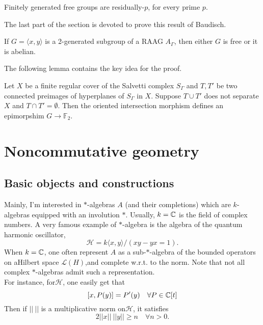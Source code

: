 \begin{prop}
Finitely generated free groups are residually-$p$, for every prime $p$.
\end{prop}

The last part of the section is devoted to prove this result of Baudisch.
\begin{thm}
If $G=\langle x, y \rangle$ is a 2-generated subgroup of a RAAG $A_\Gamma$, then either $G$ is free or it is abelian. 
\end{thm}

The following lemma contains the key idea for the proof. 
\begin{lem}
Let $X$ be a finite regular cover of the Salvetti complex $S_\Gamma$ and $T,T'$ be two connected preimages of hyperplanes of $S_\Gamma$ in $X$. Suppose $T\cup T'$ does not separate $X$ and $T\cap T'=\emptyset$. Then the oriented intersection morphism defines an epimorpshim $G \rightarrow \mathbb F_2$.
\end{lem}


\section{Noncommutative geometry}

\subsection{Basic objects and constructions}

Mainly, I'm interested in $*$-algebras $A$ (and their completions) which are $k$-algebras equipped with an involution $*$. Usually, $k=\mathbb C$ is the field of complex numbers. A very famous example of $*$-algebra is the algebra of the quantum harmonic oscillator,
\[\mathcal H = k\langle x, y\rangle / (xy -yx = 1).\]
When $k=\mathbb C$, one often represent $A$ as a sub-$*$-algebra of the bounded operators on aHilbert space $\mathcal L(H)$,and complete w.r.t. to the norm. Note that not all complex $*$-algebras admit such a representation. \\

For instance, for$\mathcal H$, one easily get that 
\[[x,P(y)] = P'(y) \quad \forall P\in \mathbb C[t]\]
Then if $||\ ||$ is a multiplicative norm on$\mathcal H$, it satisfies
\[ 2 ||x|| \ ||y|| \geq n \quad \forall n>0.\]   

